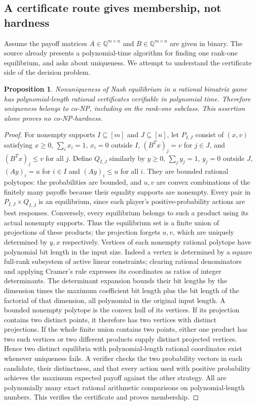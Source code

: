 \documentclass[11pt]{article}
\newtheorem{proposition}{Proposition}
\begin{document}
\subsection{A certificate route gives membership, not hardness}
Assume the payoff matrices $A\in\mathbb Q^{m\times n}$ and $B\in\mathbb Q^{m\times n}$ are given in binary. The source already presents a polynomial-time algorithm for finding one rank-one equilibrium, and asks about uniqueness. We attempt to understand the certificate side of the decision problem.
\begin{proposition}
Nonuniqueness of Nash equilibrium in a rational bimatrix game has polynomial-length rational certificates verifiable in polynomial time. Therefore uniqueness belongs to co-NP, including on the rank-one subclass. This assertion alone proves no co-NP-hardness.
\end{proposition}
\begin{proof}
For nonempty supports $I\subseteq[m]$ and $J\subseteq[n]$, let $P_{I,J}$ consist of $(x,v)$ satisfying $x\ge0$, $\sum_i x_i=1$, $x_i=0$ outside $I$, $(B^Tx)_j=v$ for $j\in J$, and $(B^Tx)_j\le v$ for all $j$. Define $Q_{I,J}$ similarly by $y\ge0$, $\sum_jy_j=1$, $y_j=0$ outside $J$, $(Ay)_i=u$ for $i\in I$ and $(Ay)_i\le u$ for all $i$. They are bounded rational polytopes: the probabilities are bounded, and $u,v$ are convex combinations of the finitely many payoffs because their equality supports are nonempty.
Every pair in $P_{I,J}\times Q_{I,J}$ is an equilibrium, since each player's positive-probability actions are best responses. Conversely, every equilibrium belongs to such a product using its actual nonempty supports. Thus the equilibrium set is a finite union of projections of these products; the projection forgets $u,v$, which are uniquely determined by $y,x$ respectively.
Vertices of each nonempty rational polytope have polynomial bit length in the input size. Indeed a vertex is determined by a square full-rank subsystem of active linear constraints; clearing rational denominators and applying Cramer's rule expresses its coordinates as ratios of integer determinants. The determinant expansion bounds their bit lengths by the dimension times the maximum coefficient bit length plus the bit length of the factorial of that dimension, all polynomial in the original input length. A bounded nonempty polytope is the convex hull of its vertices. If its projection contains two distinct points, it therefore has two vertices with distinct projections. If the whole finite union contains two points, either one product has two such vertices or two different products supply distinct projected vertices. Hence two distinct equilibria with polynomial-length rational coordinates exist whenever uniqueness fails.
A verifier checks the two probability vectors in each candidate, their distinctness, and that every action used with positive probability achieves the maximum expected payoff against the other strategy. All are polynomially many exact rational arithmetic comparisons on polynomial-length numbers. This verifies the certificate and proves membership.
\end{proof}
\end{document}
